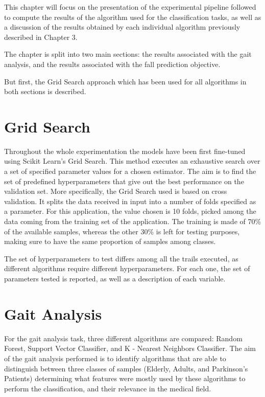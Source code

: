 This chapter will focus on the presentation of the experimental pipeline followed to compute the results of the algorithm used for the classification tasks, as well as a discussion of the results obtained by each individual algorithm previously described in Chapter 3. 


The chapter is split into two main sections: the results associated with the gait analysis, and the results associated with the fall prediction objective.


But first, the Grid Search approach which has been used for all algorithms in both sections is described.


\section{Grid Search}
Throughout the whole experimentation the models have been first fine-tuned using Scikit Learn's Grid Search. This method executes an exhaustive search over a set of specified parameter values for a chosen estimator. The aim is to find the set of predefined hyperparameters that give out the best performance on the validation set.
More specifically, the Grid Search used is based on cross validation. It splits the data received in input into a number of folds specified as a parameter. For this application, the value chosen is 10 folds, picked among the data coming from the training set of the application.
The training is made of 70\% of the available samples, whereas the other 30\% is left for testing purposes, making sure to have the same proportion of samples among classes.

The set of hyperparameters to test differs among all the trails executed, as different algorithms require different hyperparameters. For each one, the set of parameters tested is reported, as well as a description of each variable.

\section{Gait Analysis}
For the gait analysis task, three different algorithms are compared: Random Forest, Support Vector Classifier, and K - Nearest Neighbors Classifier.
The aim of the gait analysis performed is to identify algorithms that are able to distinguish between three classes of samples (Elderly, Adults, and Parkinson's Patients) determining what features were mostly used by these algorithms to perform the classification, and their relevance in the medical field. 

